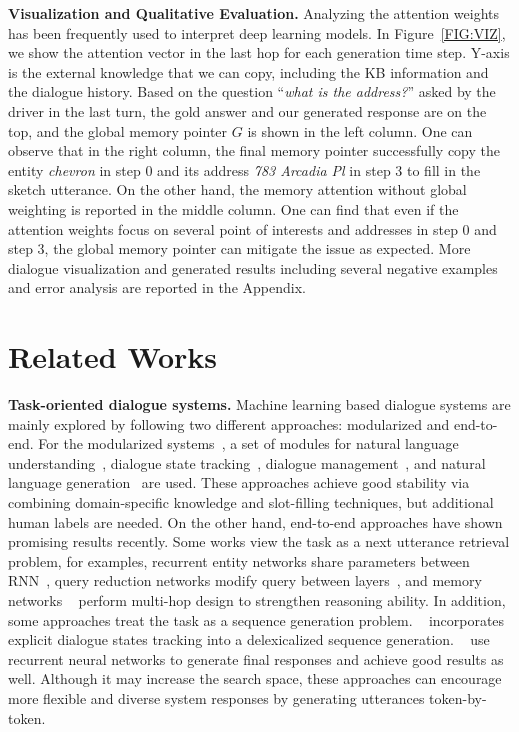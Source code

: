 \documentclass{article} \usepackage{iclr2019_conference,times}
\begin{document}
\textbf{Visualization and Qualitative Evaluation. }
Analyzing the attention weights has been frequently used to interpret deep learning models. In Figure~\ref{FIG:VIZ}, we show the attention vector in the last hop for each generation time step. Y-axis is the external knowledge that we can copy, including the KB information and the dialogue history. Based on the question ``\textit{what is the address?}'' asked by the driver in the last turn, the gold answer and our generated response are on the top, and the global memory pointer $G$ is shown in the left column. One can observe that in the right column, the final memory pointer successfully copy the entity \textit{chevron} in step 0 and its address \textit{783 Arcadia Pl} in step 3 to fill in the sketch utterance. On the other hand, the memory attention without global weighting is reported in the middle column. One can find that even if the attention weights focus on several point of interests and addresses in step 0 and step 3, the global memory pointer can mitigate the issue as expected. More dialogue visualization and generated results including several negative examples and error analysis are reported in the Appendix.

\section{Related Works}
\textbf{Task-oriented dialogue systems.}
Machine learning based dialogue systems are mainly explored by following two different approaches: modularized and end-to-end. For the modularized systems~\citep{williams2007partially, wen2016network}, a set of modules for natural language understanding~\citep{young2013pomdp, chen2016end}, dialogue state tracking~\citep{lee2016task, zhong2018global}, dialogue management~\citep{su2016line}, and natural language generation~\citep{sharma2016natural} are used. These approaches achieve good stability via combining domain-specific knowledge and slot-filling techniques, but additional human labels are needed. On the other hand, end-to-end approaches have shown promising results recently. Some works view the task as a next utterance retrieval problem, for examples, recurrent entity networks share parameters between RNN~\citep{wu2017dstc6}, query reduction networks modify query between layers~\citep{seo2016query}, and memory networks ~\citep{bordes2016learning, perez2016gated,dqmem8461426} perform multi-hop design to strengthen reasoning ability. In addition, some approaches treat the task as a sequence generation problem. ~\cite{lei2018sequicity} incorporates explicit dialogue states tracking into a delexicalized sequence generation. ~\cite{serban2016building,zhao2017generative} use recurrent neural networks to generate final responses and achieve good results as well. Although it may increase the search space, these approaches can encourage more flexible and diverse system responses by generating utterances token-by-token.
\end{document}
